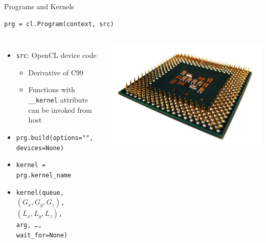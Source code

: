 \begin{frame}[fragile]{Programs and Kernels}
  \begin{lstlisting}[gobble=4]
    prg = cl.Program(context, src)
  \end{lstlisting}
  \begin{columns}
      \begin{itemize}
        \item \texttt{src}: OpenCL device code
          \begin{itemize}
            \item Derivative of C99
            \item Functions with \texttt{\_\_kernel} attribute
              can be invoked from host
          \end{itemize}
        \item \texttt{prg.build(options="",\\
          \hspace*{2em}devices=None)}
        \item \texttt{kernel = prg.kernel\_name}
        \item \texttt{kernel(queue,\\
          \hspace*{2em}$(G_x,G_y,G_z)$, $(L_x,L_y,L_z)$, \\
          \hspace*{2em}arg, \dots, \\
          \hspace*{2em}wait\_for=None)}\\
      \end{itemize}
      \hspace*{-1cm}\includegraphics[width=1.3\textwidth]{cpu.jpeg}
  \end{columns}
\end{frame}

